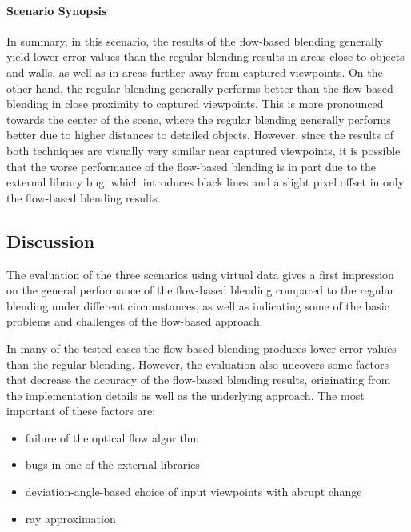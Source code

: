 \paragraph{Scenario Synopsis}
In summary, in this scenario, the results of the flow-based blending generally yield lower error values than the regular blending results in areas close to objects and walls, as well as in areas further away from captured viewpoints.
On the other hand, the regular blending generally performs better than the flow-based blending in close proximity to captured viewpoints. This is more pronounced towards the center of the scene, where the regular blending generally performs better due to higher distances to detailed objects. However, since the results of both techniques are visually very similar near captured viewpoints, it is possible that the worse performance of the flow-based blending is in part due to the external library bug, which introduces black lines and a slight pixel offset in only the flow-based blending results.

\subsection{Discussion} \label{subsec:discussion_virtual}
The evaluation of the three scenarios using virtual data gives a first impression on the general performance of the flow-based blending compared to the regular blending under different circumstances, as well as indicating some of the basic problems and challenges of the flow-based approach.


In many of the tested cases the flow-based blending produces lower error values than the regular blending. However, the evaluation also uncovers some factors that decrease the accuracy of the flow-based blending results, originating from the implementation details as well as the underlying approach. The most important of these factors are:

\begin{itemize}
  \item failure of the optical flow algorithm
  \item bugs in one of the external libraries
  \item deviation-angle-based choice of input viewpoints with abrupt change
  \item ray approximation
\end{itemize}

